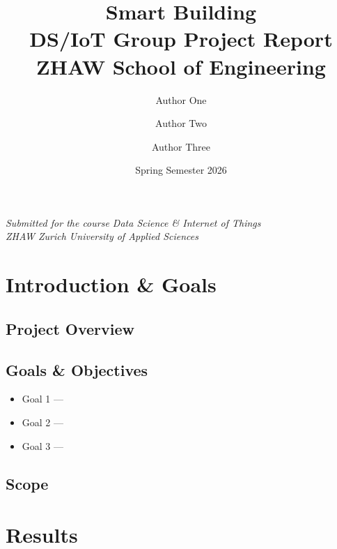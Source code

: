 \documentclass[a4paper,12pt]{article}
\title{
    \vspace{2cm}
    \textbf{Smart Building} \\[0.5em]
    \large DS/IoT Group Project Report \\[0.5em]
    \normalsize ZHAW School of Engineering
}
\author{
    Author One \and Author Two \and Author Three
}
\date{Spring Semester 2026}
\begin{document}
\maketitle
\thispagestyle{empty}
\vfill
\begin{center}
    \textit{Submitted for the course Data Science \& Internet of Things} \\
    \textit{ZHAW Zurich University of Applied Sciences}
\end{center}
\newpage

\tableofcontents
\newpage

\section{Introduction \& Goals}


\subsection{Project Overview}

\subsection{Goals \& Objectives}
\begin{itemize}
    \item Goal 1 — %
    \item Goal 2 — %
    \item Goal 3 — %
\end{itemize}

\subsection{Scope}

\section{Results}

\end{document}
